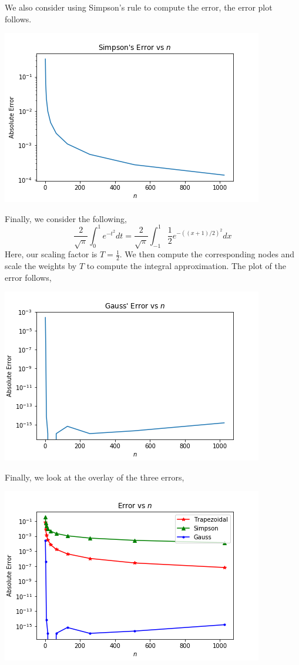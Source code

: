 \documentclass[letterpaper,10pt]{article}
\begin{document}
\begin{enumerate}
\begin{center}
\end{center}
We also consider using Simpson's rule to compute the error, the error plot follows.
\begin{center}
\includegraphics[scale=.7]{10simp.png}
\end{center}
Finally, we consider the following,
\[\frac{2}{\sqrt{\pi}}\int_0^1e^{-t^2}dt=\frac{2}{\sqrt{\pi}}\int_{-1}^1\frac{1}{2} e^{-((x+1)/2)^2}dx\]
Here, our scaling factor is $T=\frac{1}{2}$. We then compute the corresponding nodes and scale the weights by $T$ to compute the integral approximation. The plot of the error follows,
\begin{center}
\includegraphics[scale=.7]{10gauss.png}
\end{center}
Finally, we look at the overlay of the three errors,
\begin{center}
\includegraphics[scale=.7]{10allerr.png}

\end{center}
\end{enumerate}
\end{document}
